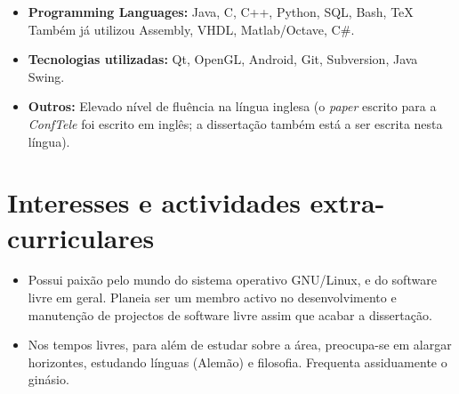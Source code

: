 \documentclass[11pt,a4paper,sans]{moderncv}        %
\begin{document}
\begin{itemize}

\item \textbf{Programming Languages:} Java, C, C++, Python, SQL, Bash, TeX \\ Também já utilizou Assembly, VHDL, Matlab/Octave, C\#.

\vspace{6pt}

\item \textbf{Tecnologias utilizadas:} Qt, OpenGL, Android, Git, Subversion, Java Swing.

\vspace{6pt}

\item \textbf{Outros: } Elevado nível de fluência na língua inglesa (o \textit{paper} escrito para a \textit{ConfTele} foi escrito em inglês; a dissertação também está a ser escrita nesta língua).

\end{itemize}

\section{Interesses e actividades extra-curriculares}

\vspace{6pt}

\begin{itemize}

\item{Possui paixão pelo mundo do sistema operativo GNU/Linux, e do software livre em geral. Planeia ser um membro activo no desenvolvimento e manutenção de projectos de software livre assim que acabar a dissertação.}

\vspace{6pt}

\item{Nos tempos livres, para além de estudar sobre a área, preocupa-se em alargar horizontes, estudando línguas (Alemão) e filosofia. Frequenta assiduamente o ginásio.}

\end{itemize}


\nocite{*}



\end{document}
